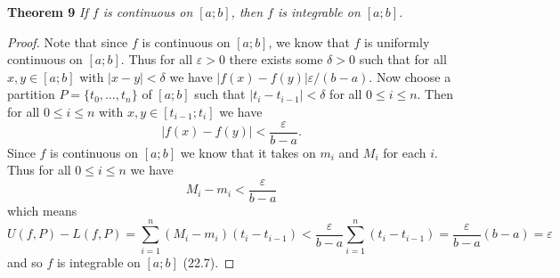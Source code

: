 \documentclass{article}
\begin{document}
\begin{flushleft}
\textbf{Theorem 9}
\textsl{If $f$ is continuous on $[a;b]$, then $f$ is integrable on $[a;b]$.}
\begin{proof}
Note that since $f$ is continuous on $[a;b]$, we know that $f$ is uniformly continuous on $[a;b]$. Thus for all $\varepsilon > 0$ there exists some $\delta > 0$ such that for all $x,y \in [a;b]$ with $|x-y| < \delta$ we have $|f(x) - f(y)| \varepsilon/(b-a)$. Now choose a partition $P = \{t_0, \dots , t_n\}$ of $[a;b]$ such that $|t_i-t_{i-1}| < \delta$ for all $0 \leq i \leq n$. Then for all $0 \leq i \leq n$ with $x,y \in [t_{i-1};t_i]$ we have
\[
|f(x)-f(y)| < \frac{\varepsilon}{b-a}.
\]
Since $f$ is continuous on $[a;b]$ we know that it takes on $m_i$ and $M_i$ for each $i$. Thus for all $0 \leq i \leq n$ we have
\[
M_i - m_i < \frac{\varepsilon}{b-a}
\]
which means
\[
U(f,P) - L(f,P) = \sum_{i=1}^n (M_i-m_i) (t_i-t_{i-1}) < \frac{\varepsilon}{b-a} \sum_{i=1}^n (t_i-t_{i-1}) = \frac{\varepsilon}{b-a}(b-a) = \varepsilon
\]
and so $f$ is integrable on $[a;b]$ (22.7).
\end{proof}


\end{flushleft}
\end{document}
